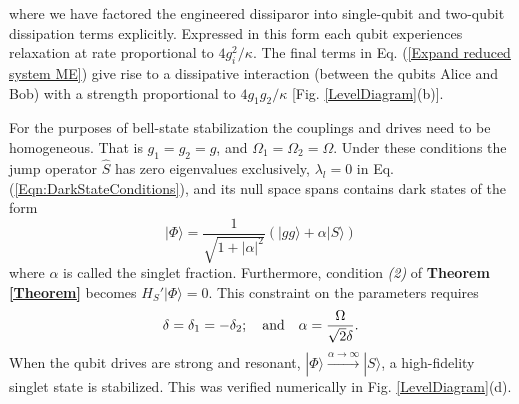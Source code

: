 %
where we have factored the engineered dissiparor into single-qubit and two-qubit dissipation terms explicitly. Expressed in this form each qubit experiences relaxation at rate proportional to $4 g_i^2 / \kappa$. The final terms in Eq. (\ref{Expand reduced system ME}) give rise to a dissipative interaction (between the qubits Alice and Bob) with a strength proportional to $4 g_1 g_2 / \kappa$ [Fig. \ref{LevelDiagram}(b)].

For the purposes of bell-state stabilization the couplings and drives need to be homogeneous. That is $g_1 = g_2 = g$, and $\Omega_1 = \Omega_2 = \Omega$. Under these conditions the jump operator $\hat{S}$ has zero eigenvalues exclusively, $\lambda_l=0$ in Eq. (\ref{Eqn:DarkStateConditions}), and its null space spans contains dark states of the form
%
\begin{equation}
\label{Two qubit Dark State}
|\Phi\rangle =\frac{1}{\sqrt{1 + |\alpha|^2 }} \left(| g g\rangle + \alpha | S\rangle \right)
\end{equation}
%
where $\alpha$ is called the singlet fraction. Furthermore, condition \textit{(2)} of \textbf{Theorem \ref{Theorem}} becomes $H_S'|\Phi\rangle=0$. This constraint on the parameters requires 
%
\begin{equation}
\delta = \delta_1 = - \delta_2; \quad {\rm and} \quad \alpha = \frac{\Omega}{\sqrt{2} \delta}.
\end{equation}
%
When the qubit drives are strong and resonant,  $|\Phi \rangle \xrightarrow{\alpha\rightarrow\infty}| S \rangle$, a high-fidelity singlet state is stabilized. This was verified numerically in Fig. \ref{LevelDiagram}(d).
%
%
%
